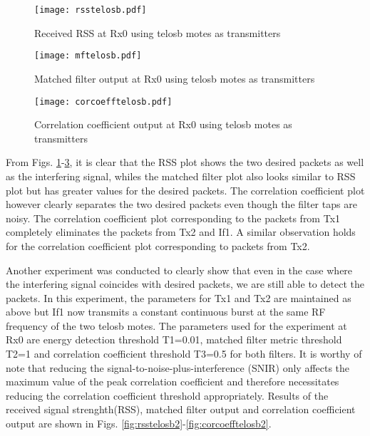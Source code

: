 \documentclass[journal]{IEEEtran}
\begin{document}
\begin{figure}[htb]
\begin{center}
	\texttt{[image: rsstelosb.pdf]} 
\caption{Received RSS at Rx0 using telosb motes as transmitters}
\label{fig:rsstelosb}
\end{center}
\end{figure}

\begin{figure}[htb]
\begin{center}
	\texttt{[image: mftelosb.pdf]} 
\caption{Matched filter output at Rx0 using telosb motes as transmitters}
\label{fig:mftelosb}
\end{center}
\end{figure}

\begin{figure}[htb]
\begin{center}
	\texttt{[image: corcoefftelosb.pdf]} 
\caption{Correlation coefficient output at Rx0 using telosb motes as transmitters}
\label{fig:corcoefftelosb}
\end{center}
\end{figure}

From Figs. \ref{fig:rsstelosb}-\ref{fig:corcoefftelosb}, it is clear that the RSS plot shows the two desired packets as well as the interfering signal, whiles the matched filter plot also looks similar to RSS plot but has greater values for the desired packets. The correlation coefficient plot however clearly separates the two desired packets even though the filter taps are noisy. The correlation coefficient plot corresponding to the packets from Tx1 completely eliminates the packets from Tx2 and If1. A similar observation holds for the correlation coefficient plot corresponding to packets from Tx2.

Another experiment was conducted to clearly show that even in the case where the interfering signal coincides with desired packets, we are still able to detect the packets. In this experiment, the parameters for Tx1 and Tx2 are maintained as above but If1 now transmits a constant continuous burst at the same RF frequency of the two telosb motes.  The parameters used for the experiment at Rx0 are energy detection threshold T1=0.01, matched filter metric threshold T2=1 and correlation coefficient threshold T3=0.5 for both filters. It is worthy of note that reducing the signal-to-noise-plus-interference (SNIR) only affects the maximum value of the peak correlation coefficient and therefore necessitates reducing the correlation coefficient threshold appropriately.  Results of the received signal strenghth(RSS), matched filter output and correlation coefficient output are shown in  Figs. \ref{fig:rsstelosb2}-\ref{fig:corcoefftelosb2}.
\end{document}
